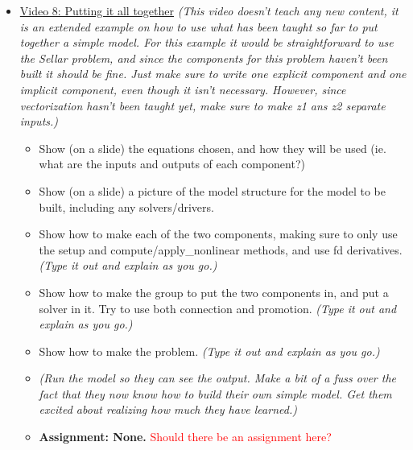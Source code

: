 \documentclass[12pt, letterpaper]{article}
\begin{document}
\begin{itemize}
	\item \underline{Video 8: Putting it all together} \textit{(This video doesn’t teach any new content, it is an extended example on how to use what has been taught so far to put together a simple model. For this example it would be straightforward to use the Sellar problem, and since the components for this problem haven't been built it should be fine. Just make sure to write one explicit component and one implicit component, even though it isn't necessary. However, since vectorization hasn't been taught yet, make sure to make z1 ans z2 separate inputs.)}
		\begin{itemize}
			\item Show (on a slide) the equations chosen, and how they will be used (ie. what are the inputs and outputs of each component?)
			\item Show (on a slide) a picture of the model structure for the model to be built, including any solvers/drivers.
			\item Show how to make each of the two components, making sure to only use the setup and compute/apply\_nonlinear methods, and use fd derivatives. \textit{(Type it out and explain as you go.)}
			\item Show how to make the group to put the two components in, and put a solver in it. Try to use both connection and promotion. \textit{(Type it out and explain as you go.)}
			\item Show how to make the problem. \textit{(Type it out and explain as you go.)}
			\item \textit{(Run the model so they can see the output. Make a bit of a fuss over the fact that they now know how to build their own simple model. Get them excited about realizing how much they have learned.)}
			\item \textbf{Assignment: None.} \textcolor{red}{Should there be an assignment here?}
		\end{itemize}


\end{itemize}
\end{document}

